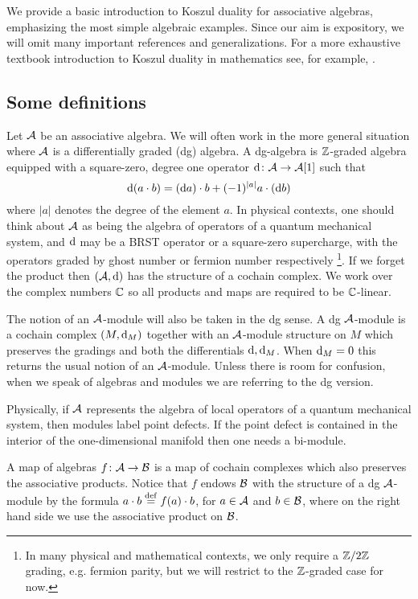 \documentclass[11pt]{amsart}
\begin{document}
We provide a basic introduction to Koszul duality for associative algebras, emphasizing the most simple algebraic examples. Since our aim is expository, we will omit many important references and generalizations. 
For a more exhaustive textbook introduction to Koszul duality in mathematics see, for example, \cite[Chapter 3]{LV}. 

\subsection{Some definitions}

Let $\mathcal A$ be an associative algebra.
We will often work in the more general situation where $\mathcal A$ is a differentially graded (dg) algebra. 
A dg-algebra is $\mathbb Z$-graded algebra equipped with a square-zero, degree one operator ${\rm d} \colon \mathcal A \to \mathcal A[1]$ such that 
\[
{\rm d} (a \cdot b) = ({\rm d} a) \cdot b + (-1)^{|a|} a \cdot ({\rm d} b) 
\]
where $|a|$ denotes the degree of the element $a$. 
In physical contexts, one should think about $\mathcal A$ as being the algebra of operators of a quantum mechanical system, and ${\rm d}$ may be a BRST operator or a square-zero supercharge, with the operators graded by ghost number or fermion number respectively \footnote{In many physical and mathematical contexts, we only require a $\mathbb Z/2\mathbb Z$ grading, e.g. fermion parity, but we will restrict to the $\mathbb Z$-graded case for now.}.
If we forget the product then $(\mathcal A, {\rm d})$ has the structure of a cochain complex. 
We work over the complex numbers $\mathbb C$ so all products and maps are required to be $\mathbb C$-linear. 

The notion of an $\mathcal A$-module will also be taken in the dg sense. A dg $\mathcal A$-module is a cochain complex $(M, {\rm d}_M)$ together with an $\mathcal A$-module structure on $M$ which preserves the gradings and both the differentials ${\rm d}, {\rm d}_M$. 
When ${\rm d}_M = 0$ this returns the usual notion of an $\mathcal A$-module. 
Unless there is room for confusion, when we speak of algebras and modules we are referring to the dg version.

Physically, if $\mathcal A$ represents the algebra of local operators of a quantum mechanical system, then modules label point defects. 
If the point defect is contained in the interior of the one-dimensional manifold then one needs a bi-module. 
 
A map of algebras $f \colon \mathcal A \to \mathcal B$ is a map of cochain complexes which also preserves the associative products.
Notice that $f$ endows $\mathcal B$ with the structure of a dg $\mathcal A$-module by the formula $a \cdot b \overset{\rm def}{=} f(a) \cdot b$, for $a \in \mathcal A$ and $b \in \mathcal B$, where on the right hand side we use the associative product on $\mathcal B$. 
\end{document}
